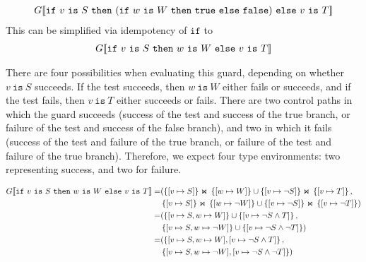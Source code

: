 \documentclass[nonacm,timestamp,manuscript]{acmart}
\newcommand{\res}[1]{\texttt{#1}}
\newcommand{\If}[3]{\res{if}\ #1\ \res{then}\ #2\ \res{else}\ #3}
\begin{document}
\begin{example}
  \begin{align*}
    \Gden{\If{v\ \res{is}\ S}{( \If{w\ \res{is}\ W}{\res{true}}{\res{false}} )}{v\ \res{is}\ T}}
  \end{align*}
  This can be simplified via idempotency of $\res{if}$ to
  \begin{align*}
    \Gden{\If{v\ \res{is}\ S}{w\ \res{is}\ W}{v\ \res{is}\ T}}
  \end{align*}

  There are four possibilities when evaluating this guard, depending on whether
  $v\ \res{is}\ S$ succeeds. If the test succeeds, then $w\ \res{is}\ W$ either
  fails or succeeds, and if the test fails, then $v\ \res{is}\ T$ either
  succeeds or fails. There are two control paths in which the guard succeeds
  (success of the test and success of the true branch, or failure of the test
  and success of the false branch), and two in which it fails (success of the
  test and failure of the true branch, or failure of the test and failure of the
  true branch). Therefore, we expect four type environments: two representing
  success, and two for failure.
  
  \begin{align*}
    \Gden{\If{v\ \res{is}\ S}{w\ \res{is}\ W}{v\ \res{is}\ T}}
    =&
       ( \JoinG{\left\{ \Map{v}{S} \right\}}{\left\{ \Map{w}{W} \right\}}
       \cup \JoinG{\left\{ \Map{v}{\neg S} \right\}}{\left\{ \Map{v}{T} \right\} }
       , \\
     & \JoinG{\left\{ \Map{v}{S} \right\}}{\left\{ \Map{w}{\neg W} \right\}}
       \cup \JoinG{\left\{ \Map{v}{\neg S} \right\}}{\left\{ \Map{v}{\neg T} \right\}}
       ) \\
    =&
       ( \left\{ [ v \mapsto S, w \mapsto W ] \right\}
       \cup \left\{ [ v \mapsto \neg S \land T ] \right\}
       , \\
     & \left\{ [ v \mapsto S, w \mapsto \neg W ] \right\}
       \cup \left\{ [ v \mapsto \neg S \land \neg T ] \right\}
       ) \\
    =& ( \left\{ [ v \mapsto S, w \mapsto W ], [ v \mapsto \neg S \land T ] \right\}
       , \\
     &  \left\{ [ v \mapsto S, w \mapsto \neg W ], [ v \mapsto \neg S \land \neg T ] \right\} )
  \end{align*}
\end{example}
\end{document}
